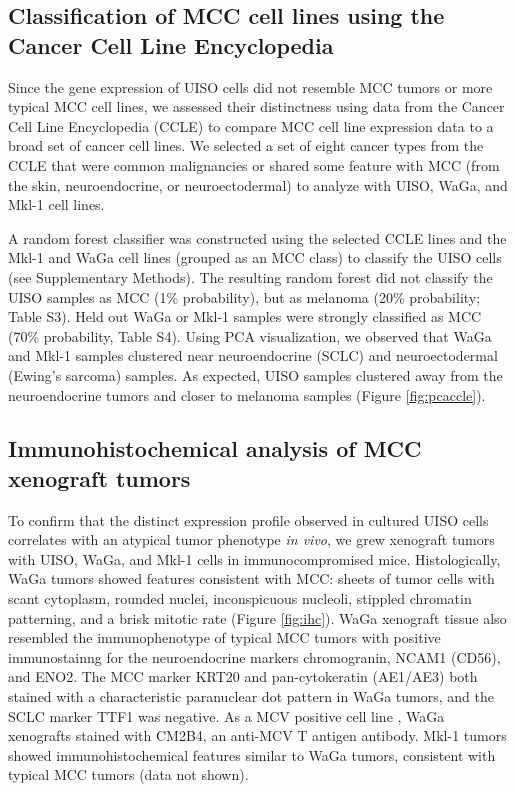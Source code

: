 \documentclass[10pt]{article}
\begin{document}
\subsection*{Classification of MCC cell lines using the Cancer Cell Line Encyclopedia}
Since the gene expression of UISO cells did not resemble MCC tumors or more typical MCC cell lines, we assessed their distinctness using data from the Cancer Cell Line Encyclopedia (CCLE)\citep{Barretina2012Cancer} to compare MCC cell line expression data to a broad set of cancer cell lines.
We selected a set of eight cancer types from the CCLE that were common malignancies or shared some feature with MCC (from the skin, neuroendocrine, or neuroectodermal) to analyze with UISO, WaGa, and Mkl-1 cell lines.

A random forest classifier was constructed using the selected CCLE lines and the Mkl-1 and WaGa cell lines (grouped as an MCC class) to classify the UISO cells (see Supplementary Methods).
The resulting random forest did not classify the UISO samples as MCC (1\% probability), but as melanoma (20\% probability; Table S3).
Held out WaGa or Mkl-1 samples were strongly classified as MCC (70\% probability, Table S4).
Using PCA visualization, we observed that WaGa and Mkl-1 samples clustered near neuroendocrine (SCLC) and neuroectodermal (Ewing’s sarcoma) samples. 
As expected, UISO samples clustered away from the neuroendocrine tumors and closer to melanoma samples (Figure \ref{fig:pcaccle}).

\subsection*{Immunohistochemical analysis of MCC xenograft tumors}
To confirm that the distinct expression profile observed in cultured UISO cells correlates with an atypical tumor phenotype \emph{in vivo}, we grew xenograft tumors with UISO, WaGa, and Mkl-1 cells in immunocompromised mice.
Histologically, WaGa tumors showed features consistent with MCC: sheets of tumor cells with scant cytoplasm, rounded nuclei, inconspicuous nucleoli, stippled chromatin patterning, and a brisk mitotic rate (Figure \ref{fig:ihc}).
WaGa xenograft tissue also resembled the immunophenotype of typical MCC tumors with positive immunostainng for the neuroendocrine markers chromogranin, NCAM1 (CD56), and ENO2.
The MCC marker KRT20 and pan-cytokeratin (AE1/AE3) both stained with a characteristic paranuclear dot pattern in WaGa tumors, and the SCLC marker TTF1 was negative.
As a MCV positive cell line \citep{Houben2010Merkel}, WaGa xenografts stained with CM2B4, an anti-MCV T antigen antibody.
Mkl-1 tumors showed immunohistochemical features similar to WaGa tumors, consistent with typical MCC tumors (data not shown).
\end{document}
